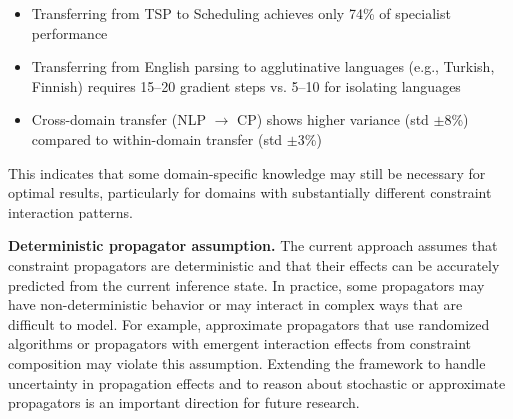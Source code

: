 \documentclass[11pt]{article}
\begin{document}
\begin{itemize}
\item Transferring from TSP to Scheduling achieves only 74\% of specialist performance
\item Transferring from English parsing to agglutinative languages (e.g., Turkish, Finnish) requires 15--20 gradient steps vs. 5--10 for isolating languages
\item Cross-domain transfer (NLP $\to$ CP) shows higher variance (std $\pm$8\%) compared to within-domain transfer (std $\pm$3\%)
\end{itemize}

This indicates that some domain-specific knowledge may still be necessary for optimal results, particularly for domains with substantially different constraint interaction patterns.

\textbf{Deterministic propagator assumption.} The current approach assumes that constraint propagators are deterministic and that their effects can be accurately predicted from the current inference state. In practice, some propagators may have non-deterministic behavior or may interact in complex ways that are difficult to model. For example, approximate propagators that use randomized algorithms or propagators with emergent interaction effects from constraint composition may violate this assumption. Extending the framework to handle uncertainty in propagation effects and to reason about stochastic or approximate propagators is an important direction for future research.
\end{document}
